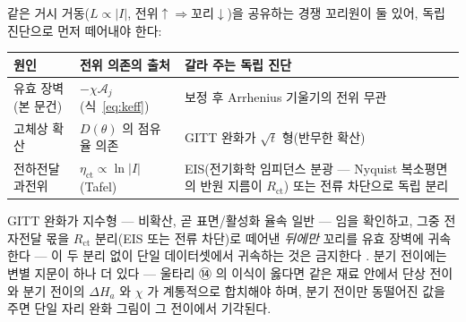 \documentclass[11pt,a4paper]{article}
\begin{document}
같은 거시 거동($L\propto|I|$, 전위$\uparrow\Rightarrow$꼬리$\downarrow$)을 공유하는 경쟁 꼬리원이
둘 있어, 독립 진단으로 먼저 떼어내야 한다:
\begin{center}
\renewcommand{\arraystretch}{1.35}
\begin{tabular}{p{} p{} p{}}
\toprule
원인 & 전위 의존의 출처 & 갈라 주는 독립 진단 \\
\midrule
유효 장벽(본 문건) & $-\chi\mathcal A_j$(식~\eqref{eq:keff}) & 보정 후 Arrhenius 기울기의 전위 무관 \\
고체상 확산 & $D(\theta)$ 의 점유율 의존 & GITT 완화가 $\sqrt t$ 형(반무한 확산) \\
전하전달 과전위 & $\eta_{\mathrm{ct}}\propto\ln|I|$(Tafel) & EIS(전기화학 임피던스 분광 — Nyquist
복소평면의 반원 지름이 $R_{\mathrm{ct}}$) 또는 전류 차단으로 독립 분리 \\
\bottomrule
\end{tabular}
\end{center}
GITT 완화가 지수형 — 비확산, 곧 표면/활성화 율속 일반 — 임을 확인하고, 그중 전자전달 몫을
$R_{\mathrm{ct}}$ 분리(EIS 또는 전류 차단)로 떼어낸 \emph{뒤에만} 꼬리를 유효 장벽에 귀속한다 — 이
두 분리 없이 단일 데이터셋에서 귀속하는 것은 금지한다 \cite{weppner1977,bardfaulkner}. 분기 전이에는
변별 지문이 하나 더 있다 — 울타리 ⑭ 의 이식이 옳다면 같은 재료 안에서 단상 전이와 분기 전이의
$\Delta H_{a}$ 와 $\chi$ 가 계통적으로 합치해야 하며, 분기 전이만 동떨어진 값을 주면 단일 자리 완화
그림이 그 전이에서 기각된다.
\end{document}
